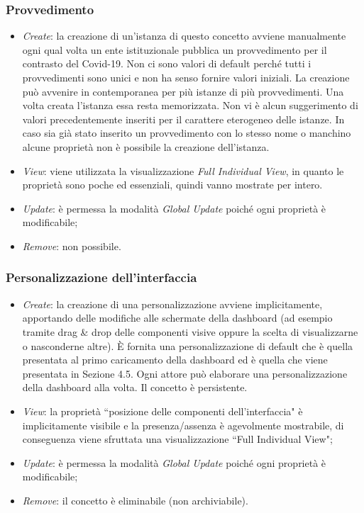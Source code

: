 \subsubsection{Provvedimento}
\label{sss:operazioni-provvedimento}
\begin{itemize}
    \item \textit{Create}: la creazione di un'istanza di questo concetto avviene manualmente ogni qual volta un ente istituzionale pubblica un provvedimento per il contrasto del Covid-19.
    Non ci sono valori di default perché tutti i provvedimenti sono unici e non ha senso fornire valori iniziali.
    La creazione può avvenire in contemporanea per più istanze di più provvedimenti.
    Una volta creata l'istanza essa resta memorizzata.
    Non vi è alcun suggerimento di valori precedentemente inseriti per il carattere eterogeneo delle istanze.
    In caso sia già stato inserito un provvedimento con lo stesso nome o manchino alcune proprietà non è possibile la creazione dell'istanza.
    \item \textit{View}: viene utilizzata la visualizzazione \textit{Full Individual View}, in quanto le proprietà sono poche ed essenziali, quindi vanno mostrate per intero.
    \item \textit{Update}: è permessa la modalità \textit{Global Update} poiché ogni proprietà è modificabile;
    \item \textit{Remove}: non possibile.
\end{itemize}

\subsubsection{Personalizzazione dell'interfaccia}
\label{sss:operazioni-personalizzazione-interfaccia}
\begin{itemize}
    \item \textit{Create}: la creazione di una personalizzazione avviene implicitamente, apportando delle modifiche alle schermate della dashboard (ad esempio tramite drag \& drop delle componenti visive oppure la scelta di visualizzarne o nasconderne altre).
    È fornita una personalizzazione di default che è quella presentata al primo caricamento della dashboard ed è quella che viene presentata in Sezione 4.5.
    Ogni attore può elaborare una personalizzazione della dashboard alla volta.
    Il concetto è persistente.
    \item \textit{View}: la proprietà ``posizione delle componenti dell'interfaccia" è implicitamente visibile e la presenza/assenza è agevolmente mostrabile, di conseguenza viene sfruttata una visualizzazione ``Full Individual View";
    \item \textit{Update}: è permessa la modalità \textit{Global Update} poiché ogni proprietà è modificabile;
    \item \textit{Remove}: il concetto è eliminabile (non archiviabile).
\end{itemize}